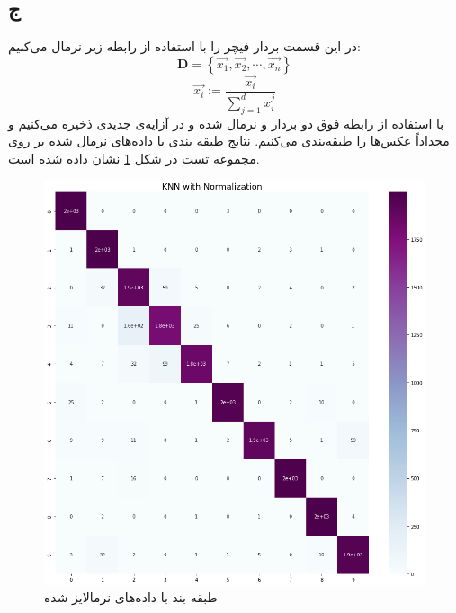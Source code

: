\documentclass[12pt,onecolumn,a4paper]{article}
\begin{document}
\subsection*{ج}
در این قسمت بردار فیچر را با استفاده از رابطه زیر نرمال می‌کنیم:
\begin{equation*}
    \mathbf{D} = \left\{\overrightarrow{x_{1}}, \overrightarrow{x_{2}}, \cdots , \overrightarrow{x_{n}}\right\} 
\end{equation*}
\begin{equation*}
    \overrightarrow{x_{i}} := \frac{\overrightarrow{x_{i}}}{\sum_{j = 1}^{d} x_{i}^{j} } 
\end{equation*}
با استفاده از رابطه فوق دو بردار  و  نرمال شده و در آزایه‌ی جدیدی ذخیره می‌کنیم و مجداداً عکس‌ها را طبقه‌بندی می‌کنیم. نتایج طبقه بندی با داده‌های نرمال شده بر روی مجموعه تست در شکل \ref{fig:3} نشان داده شده است.
\begin{figure}[h!]
    \begin{center}
    \includegraphics[scale=0.5]{q7/Q7_b2.png}
    \caption{ طبقه بند  با داده‌های نرمالایز شده}
    \label{fig:3}
    \end{center}
\end{figure}
\end{document}
